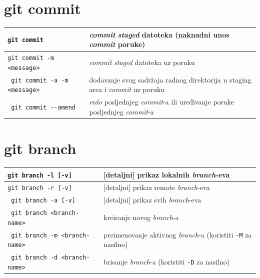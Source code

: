 \documentclass[10pt]{article}
\begin{document}
    \section*{\color{BrickRed} git commit}
    \begin{tabular}{|>{\tt}p{9.00cm}|>{}p{15.50cm}|}
        \hline
        git commit                                          & \textit{commit} \textit{staged} datoteka (naknadni unos \textit{commit} poruke) \\ \hline
        git commit -m <message>                             & \textit{commit} \textit{staged} datoteka uz poruku \\ \hline
        git commit -a -m <message>                          & dodavanje svog sadržaja radnog direktorija u staging area i \textit{commit} uz poruku \\ \hline
        git commit -{}-amend                                & \textit{redo} posljednjeg \textit{commit}-a ili uređivanje poruke posljednjeg \textit{commit}-a \\ \hline
    \end{tabular}

    \section*{\color{BrickRed} git branch}
    \begin{tabular}{|>{\tt}p{9.00cm}|>{}p{15.50cm}|}
        \hline
        git branch -l [-v]                              & [detaljni] prikaz lokalnih \textit{branch}-eva \\ \hline
        git branch -r [-v]                              & [detaljni] prikaz remote \textit{branch}-eva \\ \hline
        git branch -a [-v]                              & [detaljni] prikaz svih \textit{branch}-eva \\ \hline
        git branch <branch-name>                        & kreiranje novog \textit{branch}-a \\ \hline
        git branch -m <branch-name>                     & preimenovanje aktivnog \textit{branch}-a (koristiti \texttt{-M} za nasilno) \\ \hline
        git branch -d <branch-name>                     & brisanje \textit{branch}-a (koristiti \texttt{-D} za nasilno) \\ \hline
    \end{tabular}
\end{document}
